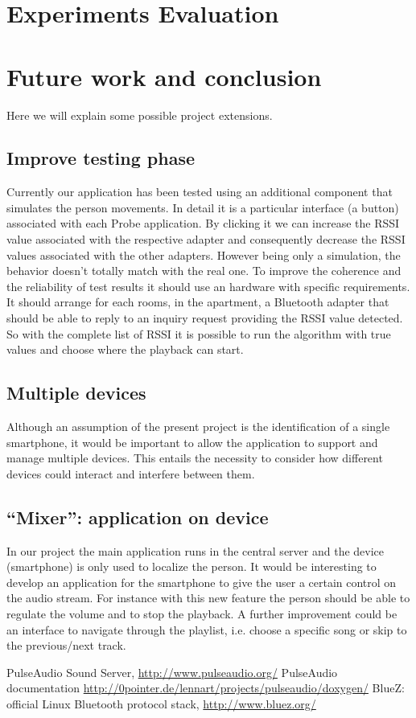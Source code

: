 \documentclass[conference]{IEEEtran}
\begin{document}
\section{Experiments Evaluation}

\section{Future work and conclusion}
Here we will explain some possible project extensions.
\subsection{Improve testing phase}
Currently our application has been tested using an additional component that simulates the person movements. In detail it is a particular interface (a button) associated with each Probe application. By clicking it we can increase the RSSI value associated with the respective adapter and consequently decrease the RSSI values associated with the other adapters. However being only a simulation, the behavior doesn't totally match  with the real one. To improve the coherence and the reliability of test results it should use an hardware with specific requirements. It should arrange for each rooms, in the apartment, a Bluetooth adapter that should be able to reply to an inquiry request providing the RSSI value detected. So with the complete list of RSSI it is possible to run the algorithm with true values and choose where the playback can start.
\subsection{Multiple devices}
Although an assumption of the present project is the identification of a single smartphone, it would be important to allow the application to support and manage multiple devices. This entails the necessity to consider how different devices could interact and interfere between them.
\subsection{``Mixer'': application on device}
In our project the main application runs in the central server and the device (smartphone) is only used to localize the person. It would be interesting to develop an application for the smartphone to give the user a certain control on the audio stream. For instance with this new feature the person should be able to regulate the volume and to stop the playback. A further improvement could be an interface to navigate through the playlist, i.e. choose a specific song or skip to the previous/next track.


\begin{thebibliography}{1}
		PulseAudio Sound Server,
		\url{http://www.pulseaudio.org/}
		PulseAudio documentation
		\url{http://0pointer.de/lennart/projects/pulseaudio/doxygen/}
		BlueZ: official Linux Bluetooth protocol stack,
		\url{http://www.bluez.org/}

\end{thebibliography}
\end{document}
